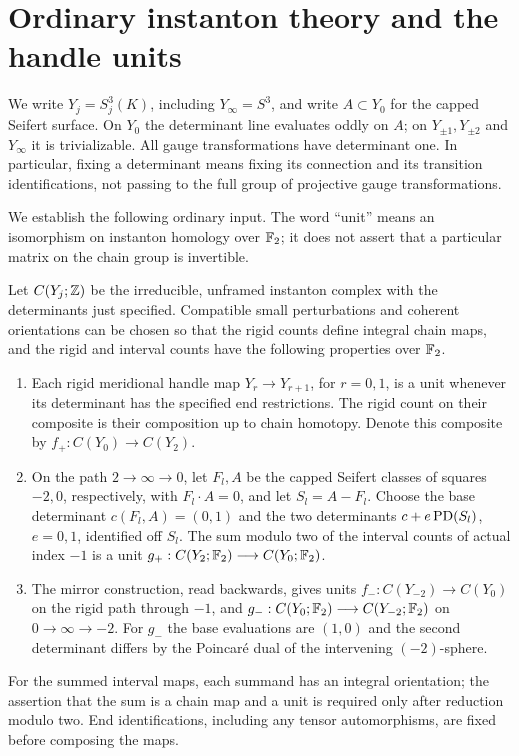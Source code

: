 \section{Ordinary instanton theory and the handle units}
\label{sec:ordinary}

We write $Y_j=S^3_j(K)$, including $Y_\infty=S^3$, and write
$A\subset Y_0$ for the capped Seifert surface.  On $Y_0$ the determinant
line evaluates oddly on $A$; on $Y_{\pm1},Y_{\pm2}$ and $Y_\infty$ it is
trivializable.  All gauge transformations have determinant one.  In
particular, fixing a determinant means fixing its connection and its
transition identifications, not passing to the full group of projective
gauge transformations.

We establish the following ordinary input.  The word ``unit'' means an
isomorphism on instanton homology over $\mathbb F_2$; it does not assert that a
particular matrix on the chain group is invertible.

\begin{theorem}\label{thm:ordinary:units}
Let $C(Y_j;\mathbb Z)$ be the irreducible, unframed instanton complex with the
determinants just specified.  Compatible small perturbations and coherent
orientations can be chosen so that the rigid counts define integral
chain maps, and the rigid and interval counts have the following
properties over $\mathbb F_2$.
\begin{enumerate}[label=\textup{(\roman*)}]
\item Each rigid meridional handle map $Y_r\longrightarrow Y_{r+1}$,
for $r=0,1$, is a unit whenever its determinant has the specified end
restrictions.  The rigid count on their composite is their composition
up to chain homotopy.  Denote this composite by
$f_+:C(Y_0)\longrightarrow C(Y_2)$.
\item On the path $2\longrightarrow\infty\longrightarrow0$, let
$F_l,A$ be the capped Seifert classes of squares $-2,0$, respectively,
with $F_l\cdot A=0$, and let $S_l=A-F_l$.  Choose the base determinant
$c(F_l,A)=(0,1)$ and the two determinants
$c+e\operatorname{PD}(S_l)$, $e=0,1$, identified off $S_l$.  The sum modulo two of
the interval counts of actual index $-1$ is a unit
$g_+:C(Y_2;\mathbb F_2)\longrightarrow C(Y_0;\mathbb F_2)$.
\item The mirror construction, read backwards, gives units
$f_-:C(Y_{-2})\longrightarrow C(Y_0)$ on the rigid path through $-1$,
and $g_-:C(Y_0;\mathbb F_2)\longrightarrow C(Y_{-2};\mathbb F_2)$ on
$0\longrightarrow\infty\longrightarrow-2$.  For $g_-$ the base
evaluations are $(1,0)$ and the second determinant differs by the
Poincar\'e dual of the intervening $(-2)$-sphere.
\end{enumerate}
For the summed interval maps, each summand has an integral orientation;
the assertion that the sum is a chain map and a unit is required only
after reduction modulo two.  End identifications, including any tensor
automorphisms, are fixed before composing the maps.
\end{theorem}


